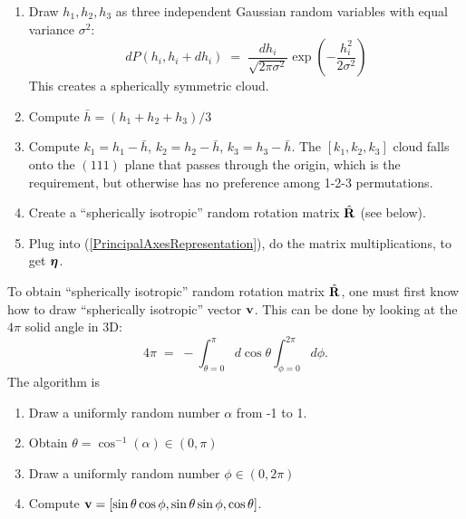 \documentclass[12pt]{article}
\def\bmath#1{\mbox{\boldmath$#1$}}
\begin{document}
\begin{enumerate}

 \item Draw $h_1,h_2,h_3$ as three independent Gaussian random variables with equal variance $\sigma^2$:  
\begin{equation}
 dP(h_i, h_i+dh_i) \;=\; \frac{dh_i}{\sqrt{2\pi\sigma^2}}\exp(-\frac{h_i^2}{2\sigma^2})
\end{equation}
 This creates a spherically symmetric cloud.
   
 \item Compute $\bar{h} = (h_1 + h_2 + h_3)/3$

 \item Compute $k_1 = h_1 - \bar{h}$, $k_2 = h_2 - \bar{h}$, $k_3 =
 h_3 - \bar{h}$.  The $[k_1,k_2,k_3]$ cloud falls onto the $(111)$
 plane that passes through the origin, which is the requirement, but
 otherwise has no preference among 1-2-3 permutations.

 \item Create a ``spherically isotropic'' random rotation matrix
 $\hat{\bf R}$ (see below).

 \item Plug into (\ref{PrincipalAxesRepresentation}), do the matrix
 multiplications, to get $\bmath{\eta}$.

\end{enumerate}

To obtain ``spherically isotropic'' random rotation matrix $\hat{\bf
 R}$, one must first know how to draw ``spherically isotropic'' vector
 ${\bf v}$.  This can be done by looking at the $4\pi$ solid angle in
 3D:
\begin{equation}
 4\pi \;=\; -\int_{\theta=0}^{\pi} d\cos\theta \int_{\phi=0}^{2\pi} d\phi.
\end{equation}
The algorithm is 
\begin{enumerate}
 \item Draw a uniformly random number $\alpha$ from -1 to 1.

 \item Obtain $\theta = \cos^{-1}(\alpha) \in (0, \pi)$

 \item Draw a uniformly random number $\phi \in (0, 2\pi)$

 \item Compute ${\bf v} = [\sin\theta\cos\phi, \sin\theta\sin\phi, \cos\theta]$.
\end{enumerate}
\end{document}
